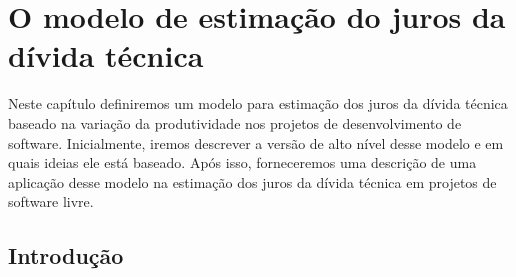 \chapter{O modelo de estimação do juros da dívida técnica}
\label{estimacao:juros}

Neste capítulo definiremos um modelo para estimação dos juros da dívida técnica baseado na variação da produtividade nos projetos de desenvolvimento de software. Inicialmente, iremos descrever a versão de alto nível desse modelo e em quais ideias ele está baseado. Após isso, forneceremos uma descrição de uma aplicação desse modelo na estimação dos juros da dívida técnica em projetos de software livre.



\section{Introdução}




